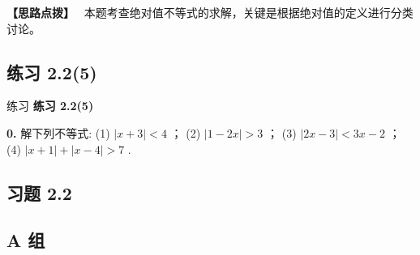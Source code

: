 \documentclass[a4paper,10pt,oneside,fontset=none]{ctexbook}
\newenvironment{exercise}[1][]{\begin{exBox}{练习}{#1}}{\end{exBox}}
\numberwithin{equation}{chapter}
\newenvironment{hint}{\begin{hintBox}\textbf{【思路点拨】}~}{\end{hintBox}}
\begin{document}
\begin{hint}
本题考查绝对值不等式的求解，关键是根据绝对值的定义进行分类讨论。
\end{hint}

\subsection*{练习 2.2(5)}

\begin{exercise}
\textbf{练习 2.2(5)}\par\vspace{0.5em}
\textbf{0.} 解下列不等式: (1) $\left| {x + 3}\right|  < 4$ ； (2) $\left| {1 - {2x}}\right|  > 3$ ； (3) $\left| {{2x} - 3}\right|  < {3x} - 2$ ； (4) $\left| {x + 1}\right|  + \left| {x - 4}\right|  > 7$ .
\end{exercise}

\subsection*{习题 2.2}

\subsection*{A 组}
\end{document}
